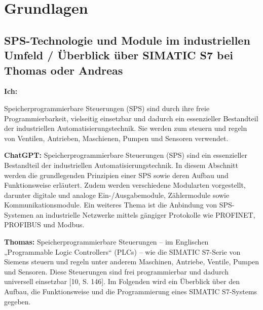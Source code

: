 \chapter{Grundlagen} 

\section{SPS-Technologie und Module im industriellen Umfeld /  Überblick über SIMATIC S7 bei Thomas oder Andreas}  
\textbf{Ich:}

Speicherprogrammierbare Steuerungen (SPS) sind durch ihre freie Programmierbarkeit, vielseitig einsetzbar und dadurch ein essenzieller Bestandteil der industriellen Automatisierungstechnik.
Sie werden zum steuern und regeln von Ventilen, Antrieben, Maschienen, Pumpen und Sensoren verwendet. 

\textbf{ChatGPT:}
Speicherprogrammierbare Steuerungen (SPS) sind ein essenzieller Bestandteil der industriellen Automatisierungstechnik. In diesem Abschnitt werden die grundlegenden Prinzipien einer SPS sowie deren Aufbau und Funktionsweise erläutert.  
Zudem werden verschiedene Modularten vorgestellt, darunter digitale und analoge Ein-/Ausgabemodule, Zählermodule sowie Kommunikationsmodule.  
Ein weiteres Thema ist die Anbindung von SPS-Systemen an industrielle Netzwerke mittels gängiger Protokolle wie PROFINET, PROFIBUS und Modbus.  

\textbf{Thomas:}
Speicherprogrammierbare Steuerungen – im Englischen „Programmable Logic Controllers“ 
(PLCs) – wie die SIMATIC S7-Serie von Siemens steuern und regeln unter anderem Maschinen, 
Antriebe, Ventile, Pumpen und Sensoren. Diese Steuerungen sind frei programmierbar und 
dadurch universell einsetzbar [10, S. 146]. Im Folgenden wird ein Überblick über den Aufbau, 
die Funktionsweise und die Programmierung eines SIMATIC S7-Systems gegeben.

